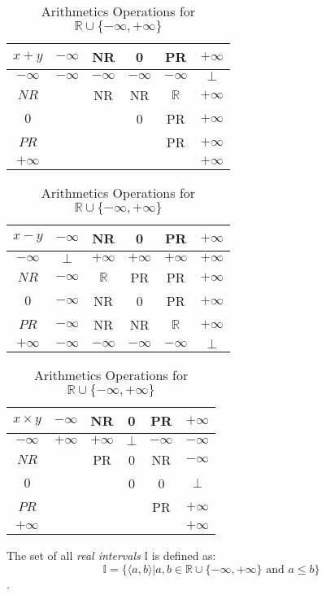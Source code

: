 \begin{table} \label{tab:arithOp}
\begin{tabular}{c||*{5}{c|}}
$x + y$
&$-\infty$&NR&0
&PR&$+\infty$\\\hline
$-\infty$ &$-\infty$&$-\infty$&$-\infty$&$-\infty$&$\bot$\\\hline
$NR$ &&NR&NR&$\mathbb{R}$&$+\infty$\\\hline
$0$&&&0&PR&$+\infty$\\\hline
$PR$ &&&&PR&$+\infty$\\\hline
$+\infty$ &&&&&$+\infty$\\\hline
\end{tabular}
\quad
\begin{tabular}{c||*{5}{c|}}
$x - y$
&$-\infty$&NR&0
&PR&$+\infty$\\\hline
$-\infty$ &$\bot$&$+\infty$&$+\infty$&$+\infty$&$+\infty$\\\hline
$NR$ &$-\infty$&$\mathbb{R}$&PR&PR&$+\infty$\\\hline
$0$&$-\infty$&NR&0&PR&$+\infty$\\\hline
$PR$ &$-\infty$&NR&NR&$\mathbb{R}$&$+\infty$\\\hline
$+\infty$ &$-\infty$&$-\infty$&$-\infty$&$-\infty$&$\bot$\\\hline
\end{tabular}
\newline
\vspace*{1 cm}
\newline
\begin{center}
\begin{tabular}{c||*{5}{c|}}
$x \times y$
&$-\infty$&NR&0
&PR&$+\infty$\\\hline
$-\infty$ &$+\infty$&$+\infty$&$\bot$&$-\infty$&$-\infty$\\\hline
$NR$ &&PR&0&NR&$-\infty$\\\hline
$0$&&&0&0&$\bot$\\\hline
$PR$ &&&&PR&$+\infty$\\\hline
$+\infty$ &&&&&$+\infty$\\\hline
\end{tabular}
\end{center}
\caption{Arithmetics Operations for $\mathbb{R} \cup \{-\infty, +\infty\}$}
\end{table}

\begin{definition} \label{def:real_intervals}
The set of all \emph{real intervals} $\mathbb{I}$ is defined as: \[\mathbb{I} = \{\langle a, b \rangle | a, b \in \mathbb{R} \cup \{-\infty, +\infty\} \text{ and } a \le b \}\].
\end{definition}

